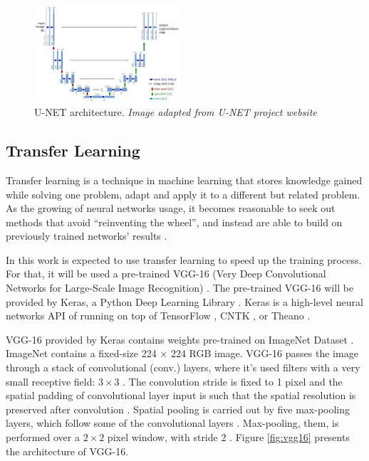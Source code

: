 \documentclass[10pt,twocolumn,letterpaper]{article}
\begin{document}
\begin{figure}[ht]
  \centering
  \includegraphics[width=0.48\textwidth]{unet.png}
  \caption{U-NET architecture. \textit{Image adapted from U-NET project website} \cite{UNET_WEBSITE} \cite{UNET}}
  \label{fig:unet}
\end{figure}

\subsection{Transfer Learning} \label{ssec:transfer_learning}

Transfer learning is a technique in machine learning that stores knowledge gained while solving one problem, adapt and apply it to a different but related problem. As the growing of neural networks usage, it becomes reasonable to seek out methods that avoid ``reinventing the wheel'', and instead are able to build on previously trained networks' results \cite{PRATT} \cite{WEISS2016}.

In this work is expected to use transfer learning to speed up the training process. For that, it will be used a pre-trained VGG-16 (Very Deep Convolutional Networks for Large-Scale Image Recognition) \cite{VGGNET}. The pre-trained VGG-16 will be provided by Keras, a Python Deep Learning Library \cite{KERAS}. Keras is a high-level neural networks API of running on top of TensorFlow \cite{TENSORFLOW}, CNTK \cite{CNTK}, or Theano \cite{THEANO} \cite{KERAS}.

VGG-16 provided by Keras contains weights pre-trained on ImageNet Dataset \cite{IMAGENET}. ImageNet contains a fixed-size 224 × 224 RGB image. VGG-16 passes the image through a stack of convolutional (conv.) layers, where it's used filters with a very small receptive field: $3 \times 3$ \cite{VGGNET}. The convolution stride is fixed to 1 pixel and the spatial padding of convolutional layer input is such that the spatial resolution is preserved after convolution \cite{VGGNET}. Spatial pooling is carried out by five max-pooling layers, which follow some of the convolutional layers \cite{VGGNET}. Max-pooling, them, is performed over a $2 \times 2$ pixel window, with stride 2 \cite{VGGNET}. Figure \ref{fig:vgg16} presents the architecture of VGG-16.
\end{document}
